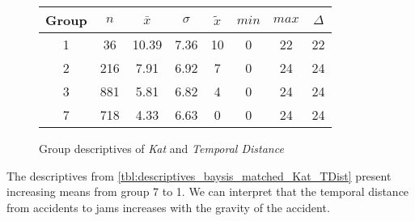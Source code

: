 \begin{figure}[ht!]
	\centering
	\begin{minipage}{0.5\textwidth}
		\tiny
		\setlength{\tabcolsep}{4pt}
		\centering
		\begin{tabular}{c|c|c|c|c|c|c|c}
			\toprule
			Group & $n$ & $\bar{x}$ & $\sigma$ & $\tilde{x}$ & $min$ & $max$ & $\Delta$ \\
			\midrule
			1 & 36  & 10.39 & 7.36 & 10 & 0 & 22 & 22 \\ 
			2 & 216 & 7.91  & 6.92 & 7  & 0 & 24 & 24 \\ 
			3 & 881 & 5.81  & 6.82 & 4  & 0 & 24 & 24 \\ 
			7 & 718 & 4.33  & 6.63 & 0  & 0 & 24 & 24 \\ 
			\bottomrule
		\end{tabular}
		\label{tbl:descriptives_baysis_matched_Kat_TDist}
	\end{minipage}%
	\begin{minipage}{0.55\textwidth}
		\tiny
		\centering
		\vfill
		\label{fig:descriptives_baysis_matched_Kat_TDist}
	\end{minipage}%
	\caption{Group descriptives of  \textit{Kat} and \textit{Temporal Distance}}
\end{figure}
The descriptives from \cref{tbl:descriptives_baysis_matched_Kat_TDist} present increasing means from group 7 to 1. We can interpret that the temporal distance from accidents to jams increases with the gravity of the accident.

